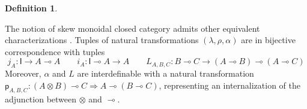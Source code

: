 \documentclass[submission,copyright,creativecommons]{eptcs}
\theoremstyle{definition}
\newtheorem{defn}{Definition}[section]
\newcommand{\ot}{\otimes}
\newcommand{\lolli}{\multimap}
\newcommand{\I}{\mathsf{I}}
\begin{document}
\begin{defn}
\begin{center}

\end{center}
\end{defn}
The notion of skew monoidal closed category admits other equivalent characterizations \cite{street:skew-closed:2013,uustalu:eilenberg-kelly:2020}. Tuples of natural transformations $(\lambda , \rho , \alpha)$ are in bijective correspondence with tuples
\[
j_A : \I \to A \lolli A \qquad i_A : \I \lolli A \to A \qquad L_{A,B,C} : B \lolli C \to (A \lolli B) \lolli (A \lolli C)
\]
Moreover, $\alpha$ and $L$ are interdefinable with a natural transformation $\mathsf{p}_{A , B , C} : (A \ot B) \lolli C \Longrightarrow A \lolli (B \lolli C)$, representing an internalization of the adjunction between $\ot$ and $\lolli$.
\end{document}
